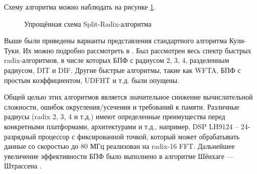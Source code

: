 Схему алгоритма можно наблюдать на рисунке \ref{figure: split-radix}.
\begin{figure}[ht]
\centering
\caption{Упрощённая схема Split-Radix-алгоритма}
\label{figure: split-radix}
\end{figure}

Выше были приведены варианты представления стандартного алгоритма Кули-Туки.
Их можно подробно рассмотреть в \cite{CT-FFT, NTT-using-cyclotomic-polynomials}.
Был рассмотрен весь спектр быстрых radix-алгоритмов, в числе которых БПФ с радиусом 2, 3, 4, разделенным радиусом, DIT и DIF.
Другие быстрые алгоритмы, такие как WFTA, БПФ с простым коэффициентом, UDFHT и т.д. были опущены.

Общей целью этих алгоритмов является значительное снижение вычислительной сложности, ошибок округления/усечения и требований к памяти.
Различные радиусы (radix 2, 3, 4 и т.д.) имеют определенные преимущества перед конкретными платформами, архитектурами и т.д., например, DSP LH9124 – 24-разрядный процессор с фиксированной точкой, который может обрабатывать данные со скоростью до 80 МГц реализован на radix-16 FFT.
Дальнейшее увеличение эффективности БПФ было выполнено в алгоритме Шёнхаге — Штрассена \cite{Schonhage}.

